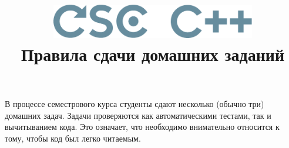 \documentclass[a4paper,10pt]{article}
\begin{document}


\title{\includegraphics[height=15mm]{../CSCCPP}\\[1em]
Правила сдачи домашних заданий}
\preauthor{}
\author{}
\postauthor{}

\maketitle

В процессе семестрового курса студенты сдают несколько (обычно три) домашних
задач. Задачи проверяются как автоматическими тестами, так и вычитыванием кода.
Это означает, что необходимо внимательно относится к тому, чтобы код был легко
читаемым.  
\end{document}

